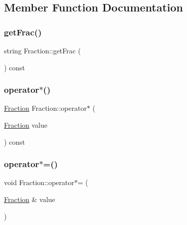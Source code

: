 \subsection{Member Function Documentation}
\hypertarget{class_fraction_af475a2e5500fd3a0c36d918a2950464c}{}\label{class_fraction_af475a2e5500fd3a0c36d918a2950464c} 
\subsubsection{\texorpdfstring{get\+Frac()}{getFrac()}}
{\footnotesize\ttfamily string Fraction\+::get\+Frac (\begin{DoxyParamCaption}{ }\end{DoxyParamCaption}) const}

\hypertarget{class_fraction_a88635ae851c5f33fe0c313319303220b}{}\label{class_fraction_a88635ae851c5f33fe0c313319303220b} 
\subsubsection{\texorpdfstring{operator$\ast$()}{operator*()}}
{\footnotesize\ttfamily \hyperlink{class_fraction}{Fraction} Fraction\+::operator$\ast$ (\begin{DoxyParamCaption}\item[{\hyperlink{class_fraction}{Fraction}}]{value }\end{DoxyParamCaption}) const}

\hypertarget{class_fraction_a17225bab7600e54903a4716d21f6186b}{}\label{class_fraction_a17225bab7600e54903a4716d21f6186b} 
\subsubsection{\texorpdfstring{operator$\ast$=()}{operator*=()}}
{\footnotesize\ttfamily void Fraction\+::operator$\ast$= (\begin{DoxyParamCaption}\item[{\hyperlink{class_fraction}{Fraction} \&}]{value }\end{DoxyParamCaption})}

\hypertarget{class_fraction_ab72bc0a193460150fed673962f0681b9}{}\label{class_fraction_ab72bc0a193460150fed673962f0681b9} 
